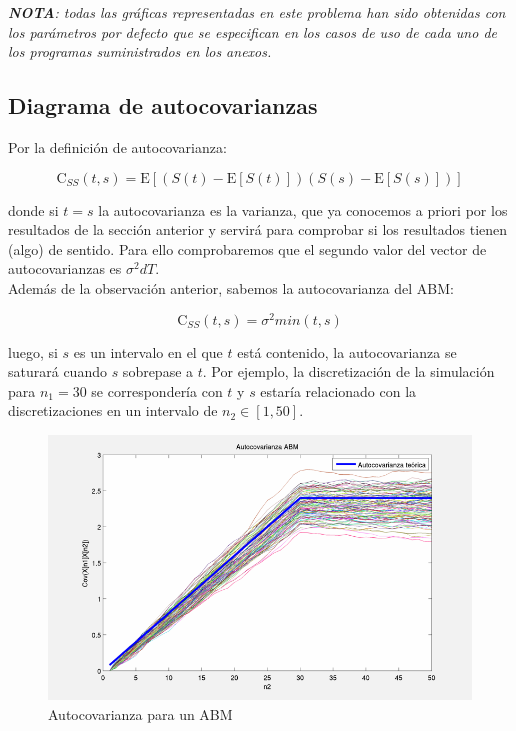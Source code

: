\documentclass[a4paper,11pt]{article}
\begin{document}
\textit{\textbf{NOTA}: todas las gr\'aficas representadas en este problema han
sido obtenidas con los par\'ametros por defecto que se especifican en los casos
de uso de cada uno de los programas suministrados en los anexos.}

\subsection{Diagrama de autocovarianzas}

Por la definici\'on de autocovarianza:

\begin{equation*}
   \mathrm{C}_{SS}(t,s) = \mathrm{E}[(S(t)-\mathrm{E}[S(t)])(S(s)-\mathrm{E}[S(s)])]
\end{equation*}

donde si $t = s$ la autocovarianza es la varianza, que ya conocemos a priori por los
resultados de la secci\'on anterior y servir\'a para comprobar si los resultados
tienen (algo) de sentido. Para ello comprobaremos que el segundo valor del
vector de autocovarianzas es $\sigma^2dT$.\\

Adem\'as de la observaci\'on anterior, sabemos la autocovarianza del ABM:

\begin{equation*}
   \tag{Autocovarianza}
   \mathrm{C}_{SS}(t,s) = \sigma^2 min(t,s)
\end{equation*}

luego, si $s$ es un intervalo en el que $t$ est\'a contenido, la autocovarianza
se saturar\'a cuando $s$ sobrepase a $t$. Por ejemplo,
la discretizaci\'on de la simulaci\'on para $n_1=30$ se corresponder\'ia con $t$ y
$s$ estar\'ia relacionado con la discretizaciones en un intervalo de $n_2 \in [1,
50]$.

\begin{figure}[htb]
   \begin{center}
      \includegraphics[scale=0.5,
      keepaspectratio]{./figures/autocovABM.png}
   \end{center}
   \caption{Autocovarianza para un ABM}
\end{figure}
\end{document}
